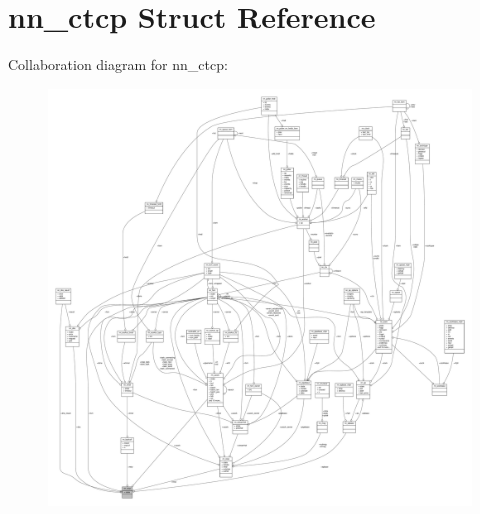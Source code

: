 \hypertarget{structnn__ctcp}{}\section{nn\+\_\+ctcp Struct Reference}
\label{structnn__ctcp}


Collaboration diagram for nn\+\_\+ctcp\+:\nopagebreak
\begin{figure}[H]
\begin{center}
\leavevmode
\includegraphics[width=350pt]{structnn__ctcp__coll__graph}
\end{center}
\end{figure}
